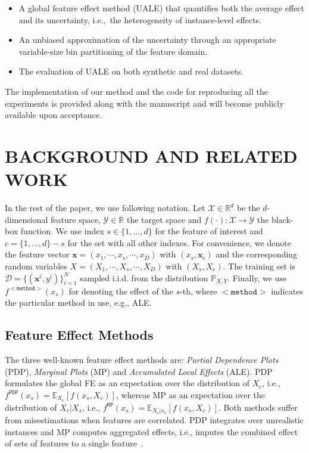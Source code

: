 \documentclass[twoside]{article}
\newcommand{\xc}{\mathbf{x}_c}
\newcommand{\xb}{\mathbf{x}}
\begin{document}
\begin{itemize}
\item A global feature effect method (UALE) that quantifies both the average effect and its uncertainty, i.e.,~the heterogeneity of instance-level effects.
\item An unbiased approximation of the uncertainty through an appropriate variable-size bin partitioning of the feature domain.
\item The evaluation of UALE on both synthetic and real datasets.
\end{itemize}

The implementation of our method and the code for reproducing all the
experiments is provided along with the manuscript and will become
publicly available upon acceptance.

\section{BACKGROUND AND RELATED WORK}

In the rest of the paper, we use following notation. Let \(\mathcal{X} \in \mathbb{R}^d\) be the \(d\)-dimensional feature space, \(\mathcal{Y} \in \mathbb{R}\) the target space and \(f(\cdot) : \mathcal{X} \rightarrow \mathcal{Y}\) the black-box function. We use index \(s \in \{1, \ldots, d\}\) for the feature of interest and \(c = \{1, \ldots, d\} - s\) for the set with all other indexes. For convenience, we denote the feature vector \(\xb = (x_1, \cdots , x_s, \cdots, x_D)\) with \((x_s, \xc)\) and the corresponding random variables \(X = (X_1, \cdots , X_s, \cdots, X_D)\) with \((X_s, X_c)\). The training set is \(\mathcal{D} = \{(\xb^i, y^i)\}_{i=1}^N\) sampled i.i.d. from the distribution \(\mathbb{P}_{X,Y}\). Finally, we use \(f^{\mathtt{<method>}}(x_s)\) for denoting the effect of the \(s\)-th, where \(\mathtt{<method>}\) indicates the particular method in use, e.g., ALE.

\subsection{Feature Effect Methods}
\label{sec:feat-effect-meth}

The three well-known feature effect methods are: \emph{Partial Dependence Plots} (PDP), \emph{Marginal Plots} (MP) and \emph{Accumulated Local Effects} (ALE).  PDP formulates the global FE as an expectation over the distribution of \(X_c\), i.e., \(f^{\mathtt{PDP}}(x_s) = \mathbb{E}_{X_c}[f(x_s,X_c)]\), whereas MP as an expectation over the distribution of \(X_c|X_s\), i.e., \(f^{\mathtt{MP}}(x_s) = \mathbb{E}_{X_c|x_s}[f(x_s, X_c)]\). Both methods suffer from misestimations when features are correlated. PDP integrates over unrealistic instances and MP computes aggregated effects, i.e., imputes the combined effect of sets of features to a single feature~\citep{apley2020visualizing}.
\end{document}
